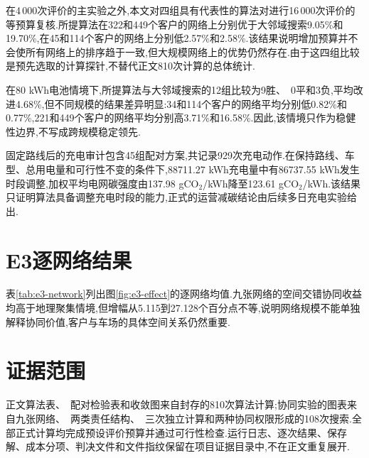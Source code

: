 \documentclass{../setp-new}
\newcommand{\setptabsetup}{\fontsize{7pt}{8.4pt}\selectfont\renewcommand{\arraystretch}{1.02}\setlength{\tabcolsep}{5pt}}
\begin{document}
在4\,000次评价的主实验之外,本文对四组具有代表性的算法对进行16\,000次评价的等预算复核.所提算法在322和449个客户的网络上分别优于大邻域搜索9.05\%和19.70\%,在45和114个客户的网络上分别低2.57\%和2.58\%.该结果说明增加预算并不会使所有网络上的排序趋于一致,但大规模网络上的优势仍然存在.由于这四组比较是预先选取的计算探针,不替代正文810次计算的总体统计.

在80 kWh电池情境下,所提算法与大邻域搜索的12组比较为9胜、~0平和3负,平均改进4.68\%,但不同规模的结果差异明显:34和114个客户的网络平均分别低0.82\%和0.77\%,221和449个客户的网络平均分别高3.71\%和16.58\%.因此,该情境只作为稳健性边界,不写成跨规模稳定领先.

固定路线后的充电审计包含45组配对方案,共记录929次充电动作.在保持路线、车型、总用电量和可行性不变的条件下,88711.27 kWh充电量中有86737.55 kWh发生时段调整,加权平均电网碳强度由137.98 gCO$_2$/kWh降至123.61 gCO$_2$/kWh.该结果只证明算法具备调整充电时段的能力,正式的运营减碳结论由后续多日充电实验给出.

\section{E3逐网络结果}

表\ref{tab:e3-network}列出图\ref{fig:e3-effect}的逐网络均值.九张网络的空间交错协同收益均高于地理聚集情境,但增幅从5.115到27.128个百分点不等,说明网络规模不能单独解释协同价值,客户与车场的具体空间关系仍然重要.

\begin{table}[H]
\centering
\caption{不同网络上的协同成本节省}
\label{tab:e3-network}
\setptabsetup

\end{table}

\section{证据范围}

正文算法表、~配对检验表和收敛图来自封存的810次算法计算;协同实验的图表来自九张网络、~两类责任结构、~三次独立计算和两种协同权限形成的108次搜索.全部正式计算均完成预设评价预算并通过可行性检查.运行日志、逐次结果、保存解、成本分项、判决文件和文件指纹保留在项目证据目录中,不在正文重复展开.
\end{document}
